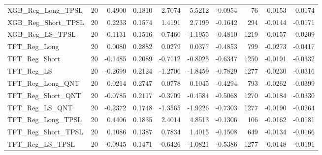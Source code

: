 \begin{tabular}{llrrrrrrrr}
\cline{1-10}
XGB\_Reg\_Long\_TPSL & 20 & 0.4900 & 0.1810 & 2.7074 & 5.5212 & -0.0954 & 76 & -0.0153 & -0.0174 \\
\cline{1-10}
XGB\_Reg\_Short\_TPSL & 20 & 0.2233 & 0.1574 & 1.4191 & 2.7199 & -0.1642 & 294 & -0.0144 & -0.0171 \\
\cline{1-10}
XGB\_Reg\_LS\_TPSL & 20 & -0.1131 & 0.1516 & -0.7460 & -1.1955 & -0.4810 & 1219 & -0.0157 & -0.0209 \\
\cline{1-10}
TFT\_Reg\_Long & 20 & 0.0080 & 0.2882 & 0.0279 & 0.0377 & -0.4853 & 799 & -0.0273 & -0.0417 \\
\cline{1-10}
TFT\_Reg\_Short & 20 & -0.1485 & 0.2089 & -0.7112 & -0.8925 & -0.6347 & 1250 & -0.0191 & -0.0332 \\
\cline{1-10}
TFT\_Reg\_LS & 20 & -0.2699 & 0.2124 & -1.2706 & -1.8459 & -0.7829 & 1277 & -0.0230 & -0.0316 \\
\cline{1-10}
TFT\_Reg\_Long\_QNT & 20 & 0.0214 & 0.2747 & 0.0778 & 0.1045 & -0.4294 & 793 & -0.0262 & -0.0399 \\
\cline{1-10}
TFT\_Reg\_Short\_QNT & 20 & -0.0785 & 0.2117 & -0.3709 & -0.4584 & -0.5068 & 1270 & -0.0184 & -0.0330 \\
\cline{1-10}
TFT\_Reg\_LS\_QNT & 20 & -0.2372 & 0.1748 & -1.3565 & -1.9226 & -0.7303 & 1277 & -0.0190 & -0.0264 \\
\cline{1-10}
TFT\_Reg\_Long\_TPSL & 20 & 0.4406 & 0.1835 & 2.4014 & 4.8513 & -0.1306 & 106 & -0.0162 & -0.0181 \\
\cline{1-10}
TFT\_Reg\_Short\_TPSL & 20 & 0.1086 & 0.1387 & 0.7834 & 1.4015 & -0.1508 & 649 & -0.0134 & -0.0166 \\
\cline{1-10}
TFT\_Reg\_LS\_TPSL & 20 & -0.0945 & 0.1471 & -0.6426 & -1.0821 & -0.5386 & 1277 & -0.0148 & -0.0191 \\
\cline{1-10}
\bottomrule
\end{tabular}
